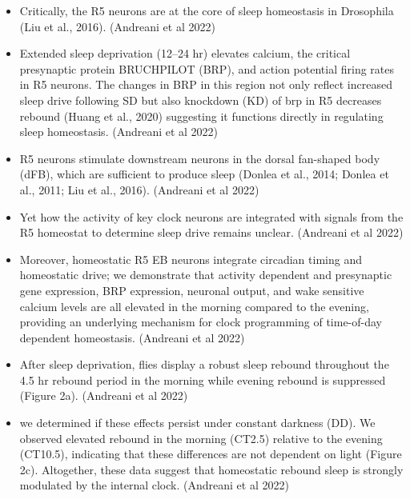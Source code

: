 \documentclass[11pt]{article}
\begin{document}
\begin{itemize}
    \item Critically, the R5 neurons are at the core of sleep homeostasis in Drosophila (Liu et al., 2016).
    \parencite{andreaniCircadianProgrammingEllipsoid2022} (Andreani et al 2022)

    \item Extended sleep deprivation (12–24 hr) elevates calcium, the critical presynaptic protein BRUCHPILOT (BRP), and action potential firing rates in R5 neurons. The changes in BRP in this region not only reflect increased sleep drive following SD but also knockdown (KD) of brp in R5 decreases rebound (Huang et al., 2020) suggesting it functions directly in regulating sleep homeostasis.
    \parencite{andreaniCircadianProgrammingEllipsoid2022} (Andreani et al 2022)

    \item R5 neurons stimulate downstream neurons in the dorsal fan-shaped body (dFB), which are sufficient to produce sleep (Donlea et al., 2014; Donlea et al., 2011; Liu et al., 2016).
    \parencite{andreaniCircadianProgrammingEllipsoid2022} (Andreani et al 2022)

    \item Yet how the activity of key clock neurons are integrated with signals from the R5 homeostat to determine sleep drive remains unclear.
    \parencite{andreaniCircadianProgrammingEllipsoid2022} (Andreani et al 2022)

    \item Moreover, homeostatic R5 EB neurons integrate circadian timing and homeostatic drive; we demonstrate that activity dependent and presynaptic gene expression, BRP expression, neuronal output, and wake sensitive calcium levels are all elevated in the morning compared to the evening, providing an underlying mechanism for clock programming of time-of-day dependent homeostasis.
    \parencite{andreaniCircadianProgrammingEllipsoid2022} (Andreani et al 2022)

    \item After sleep deprivation, flies display a robust sleep rebound throughout the 4.5 hr rebound period in the morning while evening rebound is suppressed (Figure 2a).
    \parencite{andreaniCircadianProgrammingEllipsoid2022} (Andreani et al 2022)

    \item we determined if these effects persist under constant darkness (DD). We observed elevated rebound in the morning (CT2.5) relative to the evening (CT10.5), indicating that these differences are not dependent on light (Figure 2c). Altogether, these data suggest that homeostatic rebound sleep is strongly modulated by the internal clock.
    \parencite{andreaniCircadianProgrammingEllipsoid2022} (Andreani et al 2022)


\end{itemize}
\end{document}
